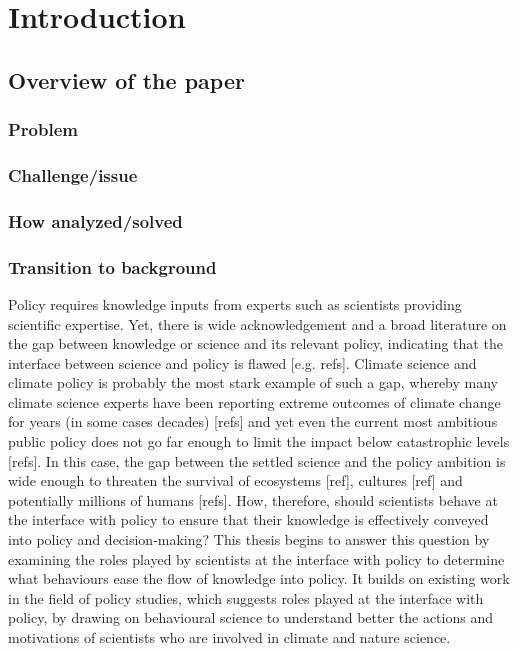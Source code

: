 \chapter{Introduction}\label{ch:intro}


\section{Overview of the paper}

\subsection{Problem}

\subsection{Challenge/issue}

\subsection{How analyzed/solved}

\subsection{Transition to background}

Policy requires knowledge inputs from experts such as scientists providing scientific expertise. Yet, there is wide acknowledgement and a broad literature on the gap between knowledge or science and its relevant policy, indicating that the interface between science and policy is flawed [e.g. refs]. Climate science and climate policy is probably the most stark example of such a gap, whereby many climate science experts have been reporting extreme outcomes of climate change for years (in some cases decades) [refs] and yet even the current most ambitious public policy does not go far enough to limit the impact below catastrophic levels [refs]. In this case, the gap between the settled science and the policy ambition is wide enough to threaten the survival of ecosystems [ref], cultures [ref] and potentially millions of humans [refs]. How, therefore, should scientists behave at the interface with policy to ensure that their knowledge is effectively conveyed into policy and decision-making? This thesis begins to answer this question by examining the roles played by scientists at the interface with policy to determine what behaviours ease the flow of knowledge into policy. It builds on existing work in the field of policy studies, which suggests roles played at the interface with policy, by drawing on behavioural science to understand better the actions and motivations of scientists who are involved in climate and nature science.   


